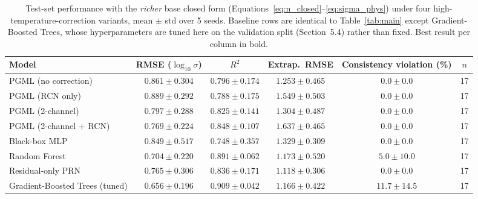 \documentclass[11pt]{article}
\begin{document}
\begin{table}[h]
\centering
\caption{Test-set performance with the \emph{richer} base closed form (Equations~\ref{eq:n_closed}--\ref{eq:sigma_phys}) under four high-temperature-correction variants, mean $\pm$ std over 5 seeds. Baseline rows are identical to Table~\ref{tab:main} except Gradient-Boosted Trees, whose hyperparameters are tuned here on the validation split (Section~5.4) rather than fixed. Best result per column in bold.}
\label{tab:richer}
\begin{tabular}{lccccc}
\toprule
Model & RMSE ($\log_{10}\sigma$) & $R^2$ & Extrap.\ RMSE & Consistency violation (\%) & $n$ \\
\midrule
PGML (no correction)          & $0.861 \pm 0.304$ & $0.796 \pm 0.174$ & $1.253 \pm 0.465$ & $\mathbf{0.0 \pm 0.0}$ & 17 \\
PGML (RCN only)                & $0.889 \pm 0.292$ & $0.788 \pm 0.175$ & $1.549 \pm 0.503$ & $\mathbf{0.0 \pm 0.0}$ & 17 \\
PGML (2-channel)               & $0.797 \pm 0.288$ & $0.825 \pm 0.141$ & $1.304 \pm 0.487$ & $\mathbf{0.0 \pm 0.0}$ & 17 \\
PGML (2-channel + RCN)         & $0.769 \pm 0.224$ & $0.848 \pm 0.107$ & $1.637 \pm 0.465$ & $\mathbf{0.0 \pm 0.0}$ & 17 \\
Black-box MLP                  & $0.849 \pm 0.517$ & $0.748 \pm 0.357$ & $1.329 \pm 0.309$ & $\mathbf{0.0 \pm 0.0}$ & 17 \\
Random Forest                  & $0.704 \pm 0.220$ & $0.891 \pm 0.062$ & $1.173 \pm 0.520$ & $5.0 \pm 10.0$ & 17 \\
Residual-only PRN             & $0.765 \pm 0.306$ & $0.836 \pm 0.171$ & $\mathbf{1.118 \pm 0.306}$ & $\mathbf{0.0 \pm 0.0}$ & 17 \\
Gradient-Boosted Trees (tuned) & $\mathbf{0.656 \pm 0.196}$ & $\mathbf{0.909 \pm 0.042}$ & $1.166 \pm 0.422$ & $11.7 \pm 14.5$ & 17 \\
\bottomrule
\end{tabular}
\end{table}
\end{document}
